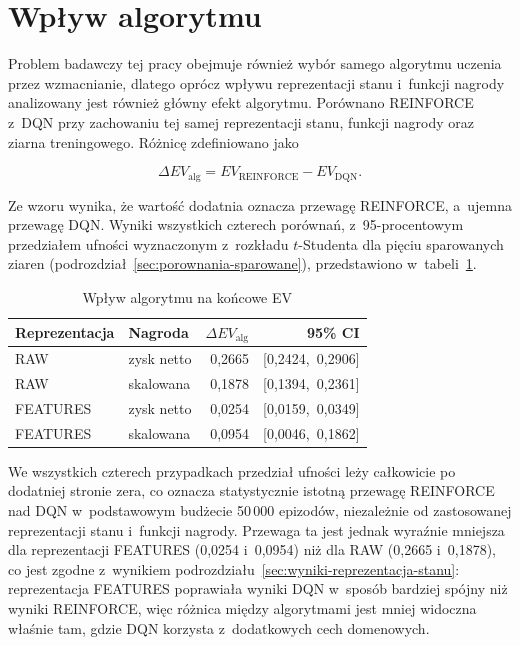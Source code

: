 \section{Wpływ algorytmu}
\label{sec:wyniki-wplyw-algorytmu}

Problem badawczy tej pracy obejmuje również wybór samego algorytmu
uczenia przez wzmacnianie, dlatego oprócz wpływu reprezentacji stanu
i~funkcji nagrody analizowany jest również główny efekt algorytmu. Porównano
REINFORCE z~DQN przy zachowaniu tej samej reprezentacji stanu, funkcji
nagrody oraz ziarna treningowego. Różnicę zdefiniowano jako

\begin{equation}
    \Delta EV_{\mathrm{alg}}
    =
    EV_{\mathrm{REINFORCE}}
    -
    EV_{\mathrm{DQN}}.
\end{equation}

Ze wzoru wynika, że wartość dodatnia oznacza przewagę REINFORCE, a~ujemna
przewagę DQN. Wyniki wszystkich czterech porównań, z~95-procentowym
przedziałem ufności wyznaczonym z~rozkładu $t$-Studenta dla pięciu
sparowanych ziaren (podrozdział~\ref{sec:porownania-sparowane}),
przedstawiono w~tabeli~\ref{tab:algorithm-effect}.

\begin{table}[htbp]
    \centering
    \caption{Wpływ algorytmu na końcowe EV}
    \label{tab:algorithm-effect}
    \begin{tabular}{llrr}
        \toprule
        Reprezentacja & Nagroda & $\Delta EV_{\mathrm{alg}}$ & 95\% CI \\
        \midrule
        RAW & zysk netto
            & 0{,}2665 & [0{,}2424,\ 0{,}2906] \\
        RAW & skalowana
            & 0{,}1878 & [0{,}1394,\ 0{,}2361] \\
        \midrule
        FEATURES & zysk netto
            & 0{,}0254 & [0{,}0159,\ 0{,}0349] \\
        FEATURES & skalowana
            & 0{,}0954 & [0{,}0046,\ 0{,}1862] \\
        \bottomrule
    \end{tabular}
\end{table}

We wszystkich czterech przypadkach przedział ufności leży całkowicie po
dodatniej stronie zera, co oznacza statystycznie istotną przewagę
REINFORCE nad DQN w~podstawowym budżecie 50\,000 epizodów, niezależnie
od zastosowanej reprezentacji stanu i~funkcji nagrody. Przewaga ta jest
jednak wyraźnie mniejsza dla reprezentacji FEATURES (0,0254 i~0,0954)
niż dla RAW (0,2665 i~0,1878), co jest zgodne z~wynikiem
podrozdziału~\ref{sec:wyniki-reprezentacja-stanu}: reprezentacja
FEATURES poprawiała wyniki DQN w~sposób bardziej spójny niż wyniki
REINFORCE, więc różnica między algorytmami jest mniej widoczna właśnie
tam, gdzie DQN korzysta z~dodatkowych cech domenowych.

